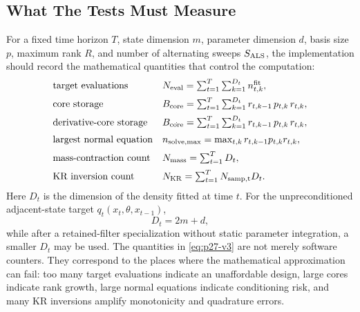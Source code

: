 \documentclass[11pt]{article}
\numberwithin{equation}{section}
\begin{document}
\subsection{What The Tests Must Measure}

For a fixed time horizon \(T\), state dimension \(m\), parameter dimension
\(d\), basis size \(p\), maximum rank \(R\), and number of alternating sweeps
\(S_{\rm ALS}\), the implementation should record the mathematical quantities
that control the computation:
\begin{equation}
\begin{array}{ll}
\text{target evaluations} &
    N_{\rm eval}
    =
    \sum_{t=1}^T\sum_{k=1}^{D_t} n_{t,k}^{\rm fit},\\[2mm]
\text{core storage} &
    B_{\rm core}
    =
    \sum_{t=1}^T\sum_{k=1}^{D_t}
    r_{t,k-1}\,p_{t,k}\,r_{t,k},\\[2mm]
\text{derivative-core storage} &
    B_{\dot{\rm core}}
    =
    \sum_{t=1}^T\sum_{k=1}^{D_t}
    r_{t,k-1}\,p_{t,k}\,r_{t,k},\\[2mm]
\text{largest normal equation} &
    n_{\rm solve,max}
    =
    \max_{t,k} r_{t,k-1}p_{t,k}r_{t,k},\\[2mm]
\text{mass-contraction count} &
    N_{\rm mass}
    =
    \sum_{t=1}^T D_t,\\[2mm]
\text{KR inversion count} &
    N_{\rm KR}
    =
    \sum_{t=1}^T N_{\rm samp,t}D_t.
\end{array}
\label{eq:p27-v3}
\end{equation}
Here \(D_t\) is the dimension of the density fitted at time \(t\).  For the
unpreconditioned adjacent-state target \(q_t(x_t,\theta,x_{t-1})\),
\[
    D_t=2m+d,
\]
while after a retained-filter specialization without static parameter
integration, a smaller \(D_t\) may be used.  The quantities in
\eqref{eq:p27-v3} are not merely software counters.  They correspond to the
places where the mathematical approximation can fail: too many target
evaluations indicate an unaffordable design, large cores indicate rank growth,
large normal equations indicate conditioning risk, and many KR inversions
amplify monotonicity and quadrature errors.
\end{document}
